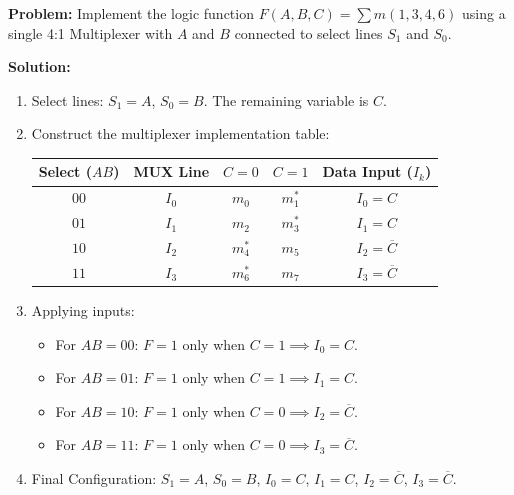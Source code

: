 \begin{examplebox}
\textbf{Problem:} Implement the logic function $F(A, B, C) = \sum m(1, 3, 4, 6)$ using a single 4:1 Multiplexer with $A$ and $B$ connected to select lines $S_1$ and $S_0$.

\textbf{Solution:}
\begin{enumerate}
    \item Select lines: $S_1 = A$, $S_0 = B$. The remaining variable is $C$.
    \item Construct the multiplexer implementation table:
    \begin{center}
    \begin{tabular}{c c c c c}
    \toprule
    \textbf{Select ($AB$)} & \textbf{MUX Line} & $C=0$ & $C=1$ & \textbf{Data Input ($I_k$)} \\
    \midrule
    $00$ & $I_0$ & $m_0$ & $m_1^*$ & $I_0 = C$ \\
    $01$ & $I_1$ & $m_2$ & $m_3^*$ & $I_1 = C$ \\
    $10$ & $I_2$ & $m_4^*$ & $m_5$ & $I_2 = \overline{C}$ \\
    $11$ & $I_3$ & $m_6^*$ & $m_7$ & $I_3 = \overline{C}$ \\
    \bottomrule
    \end{tabular}
    \end{center}
    \item Applying inputs:
    \begin{itemize}
        \item For $AB = 00$: $F = 1$ only when $C = 1 \implies I_0 = C$.
        \item For $AB = 01$: $F = 1$ only when $C = 1 \implies I_1 = C$.
        \item For $AB = 10$: $F = 1$ only when $C = 0 \implies I_2 = \overline{C}$.
        \item For $AB = 11$: $F = 1$ only when $C = 0 \implies I_3 = \overline{C}$.
    \end{itemize}
    \item Final Configuration: $S_1 = A$, $S_0 = B$, $I_0 = C$, $I_1 = C$, $I_2 = \overline{C}$, $I_3 = \overline{C}$.
\end{enumerate}
\end{examplebox}

